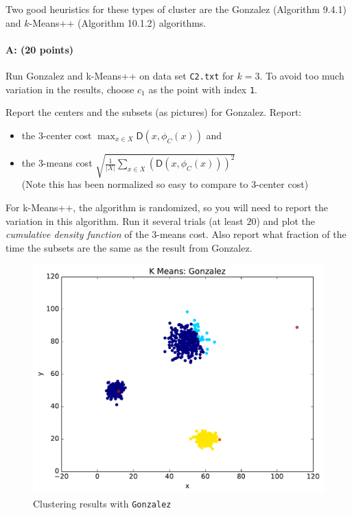 \documentclass[11pt]{article}
\newcommand{\D}{\textsf{D}}
\begin{document}
Two good heuristics for these types of cluster are the 
\textsf{Gonzalez} (Algorithm 9.4.1) and \textsf{$k$-Means++} (Algorithm 10.1.2) algorithms.  

\paragraph{A: (20 points)}
Run \textsf{Gonzalez} and \textsf{k-Means++} on data set \texttt{C2.txt} for $k=3$. 
To avoid too much variation in the results, choose $c_1$ as the point with index \texttt{1}.  

Report the centers and the subsets (as pictures) for \textsf{Gonzalez}.  Report:
\begin{itemize} \denselist
\item the $3$-center cost $\max_{x \in X} \D(x,\phi_C(x))$  and 
\item the $3$-means cost $\sqrt{\frac{1}{|X|}\sum_{x \in X} (\D(x,\phi_C(x)))^2}$
  \\ (Note this has been normalized so easy to compare to $3$-center cost)
\end{itemize}


For \textsf{k-Means++}, the algorithm is randomized, so you will need to report the variation in this algorithm.  Run it several trials (at least $20$) and plot the \emph{cumulative density function} of the $3$-means cost.  
Also report what fraction of the time the subsets are the same as the result from \textsf{Gonzalez}.  

\begin{figure}[H]
\centering
\includegraphics[width=.75\textwidth]{gonzalez.pdf}
\caption{Clustering results with {\tt Gonzalez}}
\end{figure}
\end{document}

